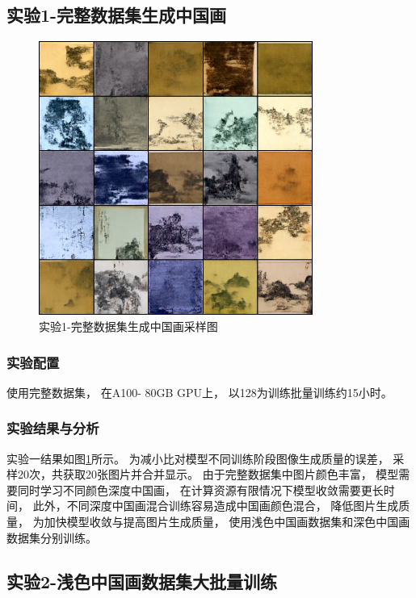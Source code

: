 \clearpage
\subsection{实验1-完整数据集生成中国画}

\begin{figure}[H]
    \centering
    \includegraphics[width=0.8\textwidth]{figures/diffusion/results1/sample-16}
    \caption{实验1-完整数据集生成中国画采样图}\label{fig:diffusion_results1_sample16}
\end{figure}

\subsubsection{实验配置}
使用完整数据集，
在A100- 80GB GPU上，
以128为训练批量训练约15小时。
\subsubsection{实验结果与分析}

实验一结果如图{\ref{fig:diffusion_results1_sample16}}所示。
为减小比对模型不同训练阶段图像生成质量的误差，
采样20次，共获取20张图片并合并显示。
由于完整数据集中图片颜色丰富，
模型需要同时学习不同颜色深度中国画，
在计算资源有限情况下模型收敛需要更长时间，
此外，不同深度中国画混合训练容易造成中国画颜色混合，
降低图片生成质量，
为加快模型收敛与提高图片生成质量，
使用浅色中国画数据集和深色中国画数据集分别训练。

\subsection{实验2-浅色中国画数据集大批量训练}

